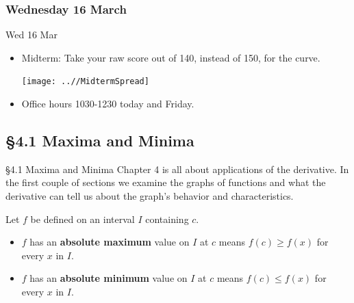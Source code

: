 \documentclass[cal1spr16Lectures.tex]{subfiles}
\begin{document}

\subsubsection{\bf Wednesday 16 March}

\begin{frame}[allowframebreaks]{Wed 16 Mar}
\begin{itemize}\footnotesize
\item Midterm: Take your raw score out of 140, instead of 150, for the curve.

\begin{center}
\texttt{[image: ..//MidtermSpread]}
\end{center}

\item Office hours 1030-1230 today and Friday.
\end{itemize}
\end{frame}

\subsection[4.1 Maxima and Minima]{\S 4.1 Maxima and Minima}

\begin{frame}{\S 4.1 Maxima and Minima}
Chapter 4 is all about applications of the derivative.  In the first couple of sections we examine the graphs of functions and what the derivative can tell us about the graph's behavior and characteristics.
\end{frame}

\begin{frame}
\small 
\begin{dfn} Let $f$ be defined on an interval $I$ containing $c$.
\begin{itemize}
\item $f$ has an {\bf absolute maximum} value on $I$ at $c$ means $f(c)\ge f(x)$ for every $x$ in $I$.
\item $f$ has an {\bf absolute minimum} value on $I$ at $c$ means $f(c)\le f(x)$ for every $x$ in $I$.
\end{itemize}
\end{dfn}
\end{frame}
\end{document}
